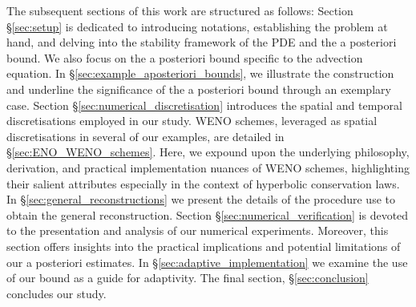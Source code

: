 \documentclass[final]{amsart}
\numberwithin{equation}{section}
\begin{document}
The subsequent sections of this work are structured as follows:
Section \S\ref{sec:setup} is dedicated to introducing notations,
establishing the problem at hand, and delving into the stability
framework of the PDE and the a posteriori bound. We also focus on the
a posteriori bound specific to the advection equation. In
\S\ref{sec:example_aposteriori_bounds}, we illustrate the construction
and underline the significance of the a posteriori bound through an
exemplary case. Section \S\ref{sec:numerical_discretisation}
introduces the spatial and temporal discretisations employed in our
study. WENO schemes, leveraged as spatial discretisations in several
of our examples, are detailed in \S\ref{sec:ENO_WENO_schemes}. Here,
we expound upon the underlying philosophy, derivation, and practical
implementation nuances of WENO schemes, highlighting their salient
attributes especially in the context of hyperbolic conservation laws.
In \S\ref{sec:general_reconstructions} we present the details of the
procedure use to obtain the general reconstruction. Section
\S\ref{sec:numerical_verification} is devoted to the presentation and
analysis of our numerical experiments. Moreover, this section offers insights
into the practical implications and potential limitations of our a
posteriori estimates.  In \S \ref{sec:adaptive_implementation} we
examine the use of our bound as a guide for adaptivity. The final
section, \S\ref{sec:conclusion} concludes our study.
\end{document}
